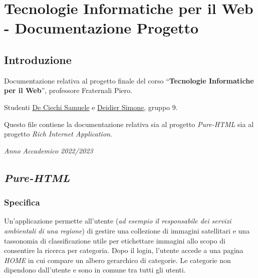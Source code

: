 \pagebreak

\hypertarget{tecnologie-informatiche-per-il-web---documentazione-progetto}{%
\section{Tecnologie Informatiche per il Web - Documentazione
Progetto}\label{tecnologie-informatiche-per-il-web---documentazione-progetto}}

\hypertarget{introduzione}{%
\subsection{Introduzione}\label{introduzione}}

Documentazione relativa al progetto finale del corso
``\textbf{Tecnologie Informatiche per il Web}'', professore Fraternali
Piero.

Studenti \href{https://github.com/Samdec01}{De Ciechi Samuele} e
\href{https://github.com/SimoneDeidier}{Deidier Simone}, gruppo 9.

Questo file contiene la documentazione relativa sia al progetto
\emph{Pure-HTML} sia al progetto \emph{Rich Internet
Application}.\newline\newline\newline

\emph{Anno Accademico 2022/2023}

\pagebreak

\hypertarget{pure-html}{%
\subsection{\texorpdfstring{\emph{Pure-HTML}}{Pure-HTML}}\label{pure-html}}

\hypertarget{specifica}{%
\subsubsection{Specifica}\label{specifica}}

Un'applicazione permette all'utente (\emph{ad esempio il responsabile
dei servizi ambientali di una regione}) di gestire una collezione di
immagini satellitari e una tassonomia di classificazione utile per
etichettare immagini allo scopo di consentire la ricerca per categoria.
Dopo il login, l'utente accede a una pagina \emph{HOME} in cui compare
un albero gerarchico di categorie. Le categorie non dipendono
dall'utente e sono in comune tra tutti gli utenti.

